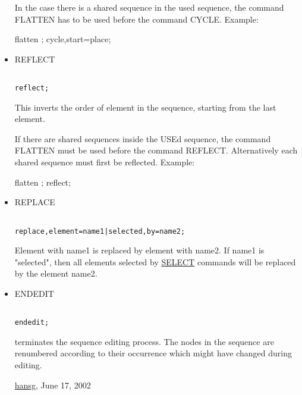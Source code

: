 \begin{itemize}
 In the case there is a shared sequence in the used sequence, the  command FLATTEN has to be used before the command CYCLE. Example: 

     flatten ; cycle,start=place; 




	\item REFLECT
\begin{verbatim}

reflect;
\end{verbatim} This inverts the order of element in the sequence, starting from the last element. 

 If there are shared sequences inside the USEd sequence, the command FLATTEN must be used before the command REFLECT.  Alternatively each shared sequence must first be reflected. Example:  

     flatten ; reflect; 




	\item REPLACE
\begin{verbatim}

replace,element=name1|selected,by=name2;
\end{verbatim} Element with name1 is replaced by element with name2. If name1 is "selected", then all elements selected by \href{../Introduction/select.html}{SELECT} commands will be replaced by the element name2. 


	\item ENDEDIT
\begin{verbatim}

endedit;
\end{verbatim} terminates the sequence editing process. The nodes in the sequence are renumbered according to their occurrence which might have changed during editing. 

\href{http://www.cern.ch/Hans.Grote/hansg_sign.html}{hansg}, June 17, 2002 
\end{itemize}

